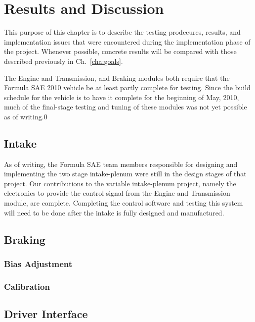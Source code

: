 \chapter{Results and Discussion}

This purpose of this chapter is to describe the testing prodecures, results, and implementation issues that were encountered during the implementation phase of the project. Whenever possible, concrete results will be compared with those described previously in Ch.\ \ref{cha:goals}.

The Engine and Transmission, and Braking modules both require that the Formula SAE 2010 vehicle be at least partly complete for testing. Since the build schedule for the vehicle is to have it complete for the beginning of May, 2010, much of the final-stage testing and tuning of these modules was not yet possible as of writing.0




\section{Intake}

As of writing, the Formula SAE team members responsible for designing and implementing the two stage intake-plenum were still in the design stages of that project. Our contributions to the variable intake-plenum project, namely the electronics to provide the control signal from the Engine and Transmission module, are complete. Completing the control software and testing this system will need to be done after the intake is fully designed and manufactured.

\section{Braking}


\subsection{Bias Adjustment}


\subsection{Calibration}





\section{Driver Interface}



